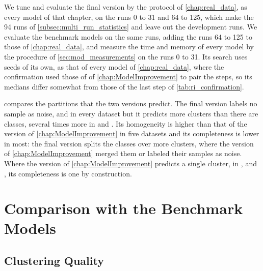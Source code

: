 We tune and evaluate the final version by the protocol of \cref{chap:real_data}, as every model of that chapter, on the runs 0 to 31 and 64 to 125, which make the 94 runs of \cref{subsec:multi_run_statistics} and leave out the development runs. We evaluate the benchmark models on the same runs, adding the runs 64 to 125 to those of \cref{chap:real_data}, and measure the time and memory of every model by the procedure of \cref{sec:mod_measurements} on the runs 0 to 31. Its search uses seeds of its own, as that of every model of \cref{chap:real_data}, where the confirmation used those of \MicroTEDAClusPlus of \cref{chap:ModelImprovement} to pair the steps, so its medians differ somewhat from those of the last step of \cref{tab:ri_confirmation}.



 compares the partitions that the two versions predict. The final version labels no sample as noise, and in every dataset but \KDDCup it predicts more clusters than there are classes, several times more in \InsectsAbrupt and \Covertype. Its homogeneity is higher than that of the version of \cref{chap:ModelImprovement} in five datasets and its completeness is lower in most: the final version splits the classes over more clusters, where the version of \cref{chap:ModelImprovement} merged them or labeled their samples as noise. Where the version of \cref{chap:ModelImprovement} predicts a single cluster, in \InsectsReoccurring, \KDDCup and \Covertype, its completeness is one by construction.

\section{Comparison with the Benchmark Models}
\label{sec:ri_comparison}

\subsection{Clustering Quality}
\label{subsec:ri_quality}




